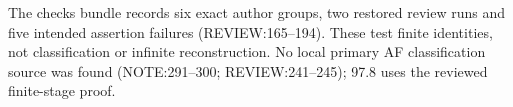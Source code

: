 The checks bundle records six exact author groups, two restored review runs and five intended assertion failures
(REVIEW:165--194). These test finite identities, not classification or infinite reconstruction. No local primary AF
classification source was found (NOTE:291--300; REVIEW:241--245); 97.8 uses the reviewed finite-stage proof.

